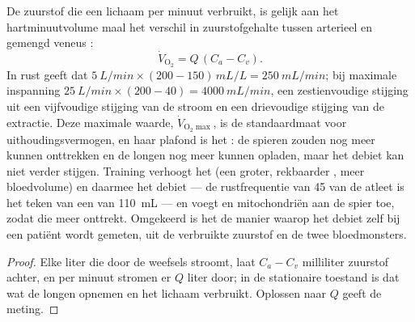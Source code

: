 \begin{theorem}\label{thm:b2:blood-pressure:fick}
De zuurstof die een lichaam per minuut verbruikt, is gelijk aan het
hartminuutvolume maal het verschil in zuurstofgehalte tussen arterieel en
gemengd veneus :
\[
\dot V_{\mathrm{O_2}} = Q\,(C_a - C_v).
\]
In rust geeft dat $\qty{5}{L/min}\times(200 - 150)\,\unit{mL/L} = \qty{250}{mL/min}$;
bij maximale inspanning $\qty{25}{L/min}\times(200 - 40) =
\qty{4000}{mL/min}$, een zestienvoudige stijging uit een vijfvoudige stijging
van de stroom en een drievoudige stijging van de extractie. Deze maximale
waarde, $\dot V_{\mathrm{O_2}\max}$, is de standaardmaat voor
uithoudingsvermogen, en haar plafond is het : de spieren zouden nog meer
kunnen onttrekken en de longen nog meer kunnen opladen, maar het debiet kan
niet verder stijgen. Training verhoogt het  (een groter, rekbaarder
, meer bloedvolume) en daarmee het debiet --- de rustfrequentie van
45 van de atleet is het teken van een  van \qty{110}{mL} --- en
voegt  en mitochondriën aan de spier toe, zodat die meer onttrekt.
Omgekeerd is het  de manier waarop het debiet zelf bij een
patiënt wordt gemeten, uit de verbruikte zuurstof en de twee bloedmonsters.
\end{theorem}
\begin{proof}
Elke liter  die door de weefsels stroomt, laat $C_a - C_v$ milliliter
zuurstof achter, en per minuut stromen er $Q$ liter door; in de stationaire
toestand is dat wat de longen opnemen en het lichaam verbruikt. Oplossen naar
$Q$ geeft de meting.
\end{proof}


